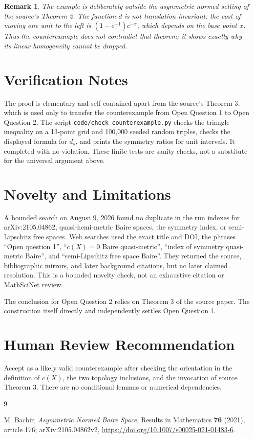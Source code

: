 \documentclass[11pt]{article}
\newtheorem{remark}{Remark}
\begin{document}
\begin{remark}
The example is deliberately outside the asymmetric normed setting of the
source's Theorem 2. The function $d$ is not translation invariant: the cost
of moving one unit to the left is $(1-e^{-1})e^{-x}$, which depends on the
base point $x$. Thus the counterexample does not contradict that theorem; it
shows exactly why its linear homogeneity cannot be dropped.
\end{remark}

\section*{Verification Notes}

The proof is elementary and self-contained apart from the source's Theorem 3,
which is used only to transfer the counterexample from Open Question 1 to Open
Question 2. The script \texttt{code/check\_counterexample.py} checks the
triangle inequality on a 13-point grid and 100,000 seeded random triples,
checks the displayed formula for $d_s$, and prints the symmetry ratios for
unit intervals. It completed with no violation. These finite tests are sanity
checks, not a substitute for the universal argument above.

\section*{Novelty and Limitations}

A bounded search on August 9, 2026 found no duplicate in the run indexes for
arXiv:2105.04862, quasi-hemi-metric Baire spaces, the symmetry index, or
semi-Lipschitz free spaces. Web searches used the exact title and DOI, the
phrases ``Open question 1'', ``$c(X)=0$ Baire quasi-metric'', ``index of
symmetry quasi-metric Baire'', and ``semi-Lipschitz free space Baire''. They
returned the source, bibliographic mirrors, and later background citations,
but no later claimed resolution. This is a bounded novelty check, not an
exhaustive citation or MathSciNet review.

The conclusion for Open Question 2 relies on Theorem 3 of the source paper.
The construction itself directly and independently settles Open Question 1.

\section*{Human Review Recommendation}

Accept as a likely valid counterexample after checking the orientation in the
definition of $c(X)$, the two topology inclusions, and the invocation of
source Theorem 3. There are no conditional lemmas or numerical dependencies.

\begin{thebibliography}{9}

M. Bachir,
\emph{Asymmetric Normed Baire Space},
Results in Mathematics \textbf{76} (2021), article 176;
arXiv:2105.04862v2,
\url{https://doi.org/10.1007/s00025-021-01483-6}.

\end{thebibliography}
\end{document}
